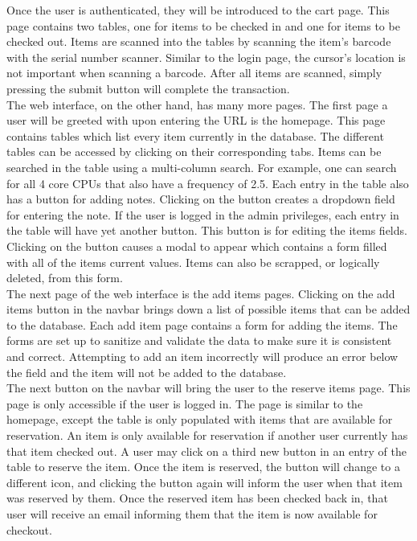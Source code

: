 \documentclass[10pt, onecolumn, twoside, peerreview]{IEEEtran}
\begin{document}
Once the user is authenticated, they will be introduced to the cart page. This page contains two tables, one for items
to be checked in and one for items to be checked out. Items are scanned into the tables by scanning the item's barcode
with the serial number scanner. Similar to the login page, the cursor's location is not important when scanning a
barcode. After all items are scanned, simply pressing the submit button will complete the transaction.\\

The web interface, on the other hand, has many more pages. The first page a user will be greeted with upon entering the
URL is the homepage. This page contains tables which list every item currently in the database. The different tables can
be accessed by clicking on their corresponding tabs. Items can be searched in the table using a multi-column search. For
example, one can search for all 4 core CPUs that also have a frequency of 2.5. Each entry in the table also has a button
for adding notes. Clicking on the button creates a dropdown field for entering the note. If the user is logged in the
admin privileges, each entry in the table will have yet another button. This button is for editing the items fields.
Clicking on the button causes a modal to appear which contains a form filled with all of the items current values. Items
can also be scrapped, or logically deleted, from this form.\\

The next page of the web interface is the add items pages. Clicking on the add items button in the navbar brings down a
list of possible items that can be added to the database. Each add item page contains a form for adding the items. The
forms are set up to sanitize and validate the data to make sure it is consistent and correct. Attempting to add an item
incorrectly will produce an error below the field and the item will not be added to the database.\\

The next button on the navbar will bring the user to the reserve items page. This page is only accessible if the user is
logged in. The page is similar to the homepage, except the table is only populated with items that are available for
reservation. An item is only available for reservation if another user currently has that item checked out. A user may
click on a third new button in an entry of the table to reserve the item. Once the item is reserved, the button will
change to a different icon, and clicking the button again will inform the user when that item was reserved by them. Once
the reserved item has been checked back in, that user will receive an email informing them that the item is now
available for checkout.\\
\end{document}
